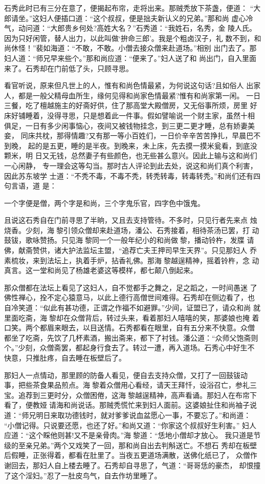 石秀此时已有三分在意了，便揭起布帘，走将出来。那贼秃放下茶盏，便道：
“大郎请坐。”这妇人便插口道：“这个叔叔，便是拙夫新认义的兄弟。”那和尚
虚心冷气，动问道：“大郎贵乡何处?高姓大名？”石秀道：“我姓石，名秀，金
陵人氏。因为只好闲管，替人出力，以此叫做‘拚命三郎’。我是个粗卤汉子，礼
数不到，和尚休怪！”裴如海道：“不敢，不敢。小僧去接众僧来赴道场。”相别
出门去了。那妇人道：“师兄早来些个。”那和尚应道：“便来了。”妇人送了和
尚出门，自入里面来了。石秀却在门前低了头，只顾寻思。

看官听说，原来但凡世上的人，惟有和尚色情最紧，为何说这句话?且如俗人
出家人，都是一般父精母血所生，缘何见得和尚家色情最紧?惟有和尚家第一闲。
一日三餐，吃了檀越施主的好斋好供，住了那高堂大殿僧房，又无俗事所烦，房里
好床好铺睡着，没得寻思，只是想着此一件事。假如譬喻说一个财主家，虽然十相
俱足，一日有多少闲事恼心，夜间又被钱物挂念，到三更二更才睡，总有娇妻美妾，
同床共枕，那得情趣?又有那一等小百姓们，一日价辛辛苦苦挣扎，早晨巴不到晚，
起的是五更，睡的是半夜。到晚来，未上床，先去摸一摸米瓮看，到底没颗米，明
日又无钱，总然妻子有些颜色，也无些甚么意兴。因此上输与这和尚们一心闲静，
专一理会这等勾当。那时古人评论到此去处，说这和尚们真个利害，因此苏东坡学
士道：“不秃不毒，不毒不秃，转秃转毒，转毒转秃。”和尚们还有四句言语，道
是：

一个字便是僧，两个字是和尚，三个字鬼乐官，四字色中饿鬼。

且说这石秀自在门前寻思了半晌，又且去支持管待。不多时，只见行者先来点
烛烧香。少刻，海黎引领众僧却来赴道场，潘公、石秀接着，相待茶汤已罢，打
动鼓钹，歌咏赞扬。只见海黎同一个一般年纪小的和尚做黎，播动铃杵，发牒
请佛，献斋赞供，诸大护法监坛主盟，“追荐亡夫王押司早生天界”。只见那妇人
乔素梳妆，来到法坛上，执着手炉，拈香礼佛。那海黎越逞精神，摇着铃杵，念
动真言。这一堂和尚见了杨雄老婆这等模样，都七颠八倒起来。

那众僧都在法坛上看见了这妇人，自不觉都手之舞之，足之蹈之，一时间愚迷
了佛性禅心，拴不定心猿意马，以此上德行高僧世间难得。石秀却在侧边看了，也
自冷笑道：“似此有甚功德，正谓之作福不如避罪。”少间，证盟已了，请众和尚
就里面吃斋，海黎却在众僧背后，转过头来，看着那妇人嘻嘻的笑，那婆娘也掩
着口笑。两个都眉来眼去，以目送情。石秀都看在眼里，自有五分来不快意。众僧
都坐了吃斋，先饮了几杯素酒，搬出斋来，都下了衬钱。潘公道：“众师父饱斋则
个。”少刻，众僧斋罢，都起身行食去了。转过一遭，再入道场。石秀心中好生不
快意，只推肚疼，自去睡在板壁后了。

那妇人一点情动，那里顾的防备人看见，便自去支持众僧，又打了一回鼓钹动
事，把些茶食果品煎点。海黎着众僧用心看经，请天王拜忏，设浴召亡，参礼三
宝。追荐到三更时分，众僧困倦，这海黎越逞精神，高声看诵。那妇人在布帘下
看了，便教娅请海和尚说话。那贼秃慌忙来到妇人面前。这婆娘扯住和尚袖子说
道：“师兄明日来取功德钱时，就对爹爹说血盆愿心一事，不要忘了。”和尚道：
“小僧记得。只说要还愿，也还了好。”和尚又道：“你家这个叔叔好生利害。”
妇人应道：“这个睬他则甚!又不是亲骨肉。”海黎道：“恁地小僧却才放心。
我只道是节级的至亲兄弟。”两个又戏笑了一回，那和尚自出去判斛送亡。不想石
秀却在板壁后假睡，正张得着，都看在肚里了。当夜五更道场满散，送佛化纸已了，
众僧作谢回去，那妇人自上楼去睡了。石秀却自寻思了，气道：“哥哥恁的豪杰，
却恨撞了这个淫妇。”忍了一肚皮鸟气，自去作坊里睡了。

